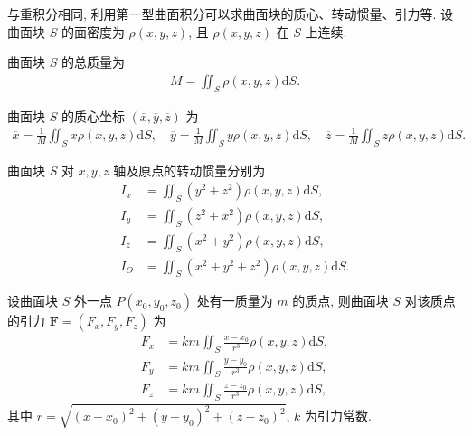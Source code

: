 \documentclass[../../main.tex]{subfiles}%
\begin{document}
\begin{definition}
与重积分相同, 利用第一型曲面积分可以求曲面块的质心、转动惯量、引力等. 设曲面块 $S$ 的面密度为 $\rho(x,y,z)$, 且 $\rho(x,y,z)$ 在 $S$ 上连续.

曲面块 $S$ 的总质量为
\begin{align*}
M = \iint_S \rho(x,y,z)\mathrm{d}S.
\end{align*}

曲面块 $S$ 的质心坐标 $(\overline{x},\overline{y},\overline{z})$ 为
\begin{align*}
\overline{x} = \frac{1}{M}\iint_S x\rho(x,y,z)\mathrm{d}S, \quad \overline{y} = \frac{1}{M}\iint_S y\rho(x,y,z)\mathrm{d}S, \quad \overline{z} = \frac{1}{M}\iint_S z\rho(x,y,z)\mathrm{d}S.
\end{align*}

曲面块 $S$ 对 $x,y,z$ 轴及原点的转动惯量分别为
\begin{align*}
I_x &= \iint_S (y^2+z^2)\rho(x,y,z)\mathrm{d}S, \\
I_y &= \iint_S (z^2+x^2)\rho(x,y,z)\mathrm{d}S, \\
I_z &= \iint_S (x^2+y^2)\rho(x,y,z)\mathrm{d}S, \\
I_O &= \iint_S (x^2+y^2+z^2)\rho(x,y,z)\mathrm{d}S.
\end{align*}

设曲面块 $S$ 外一点 $P(x_0,y_0,z_0)$ 处有一质量为 $m$ 的质点, 则曲面块 $S$ 对该质点的引力 $\bm{F}=(F_x,F_y,F_z)$ 为
\begin{align*}
F_x &= km\iint_S \frac{x-x_0}{r^3}\rho(x,y,z)\mathrm{d}S, \\
F_y &= km\iint_S \frac{y-y_0}{r^3}\rho(x,y,z)\mathrm{d}S, \\
F_z &= km\iint_S \frac{z-z_0}{r^3}\rho(x,y,z)\mathrm{d}S,
\end{align*}
其中 $r=\sqrt{(x-x_0)^2+(y-y_0)^2+(z-z_0)^2}$, $k$ 为引力常数.
\end{definition}
\end{document}
